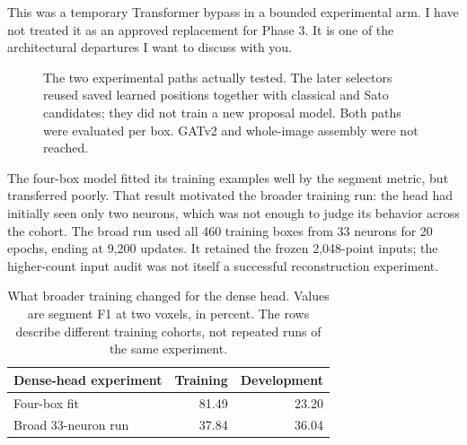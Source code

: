 \documentclass[11pt,a4paper]{article}
\newcommand{\evidence}[1]{~\cite{#1}}
\begin{document}
This was a temporary Transformer bypass in a bounded experimental arm. I have not treated it as an approved replacement for Phase 3. It is one of the architectural departures I want to discuss with you.

\begin{figure}[htbp]
\centering
{}
\caption{The two experimental paths actually tested. The later selectors reused saved learned positions together with classical and Sato candidates; they did not train a new proposal model. Both paths were evaluated per box. GATv2 and whole-image assembly were not reached.}
\label{fig:actual}
\end{figure}

The four-box model fitted its training examples well by the segment metric, but transferred poorly. That result motivated the broader training run: the head had initially seen only two neurons, which was not enough to judge its behavior across the cohort. The broad run used all 460 training boxes from 33 neurons for 20 epochs, ending at 9,200 updates. It retained the frozen 2,048-point inputs; the higher-count input audit was not itself a successful reconstruction experiment.\evidence{transfer,broad}

\begin{table}[htbp]
\centering
\caption{What broader training changed for the dense head. Values are segment F1 at two voxels, in percent. The rows describe different training cohorts, not repeated runs of the same experiment.}
\begin{tabular}{lrr}
\toprule
Dense-head experiment & Training & Development\\
\midrule
Four-box fit & 81.49 & 23.20\\
Broad 33-neuron run & 37.84 & 36.04\\
\bottomrule
\end{tabular}
\label{tab:training}
\end{table}
\end{document}
